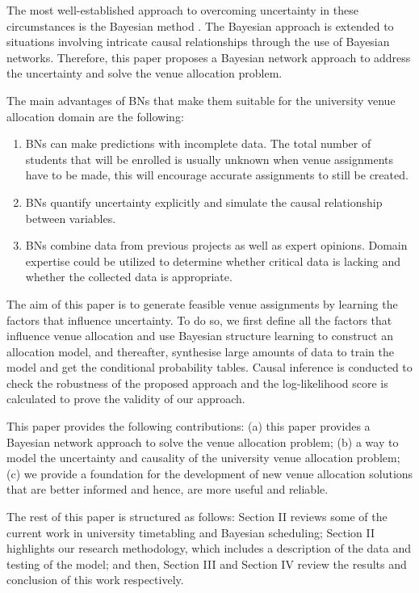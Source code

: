 \documentclass[conference]{IEEEtran}
\begin{document}
The most well-established approach to overcoming uncertainty in these circumstances is the Bayesian method \cite{efron2005bayesians}. The Bayesian approach is extended to situations involving intricate causal relationships through the use of Bayesian networks. Therefore, this paper proposes a Bayesian network approach to address the uncertainty and solve the venue allocation problem.

The main advantages of BNs that make them suitable for the university venue allocation domain are the following:
\begin{enumerate}
    \item BNs can make predictions with incomplete data. The total number of students that will be enrolled is usually unknown when venue assignments have to be made, this will encourage accurate assignments to still be created.
    \item BNs quantify uncertainty explicitly and simulate the causal relationship between variables. 
    \item BNs combine data from previous projects as well as expert opinions. Domain expertise could be utilized to determine whether critical data is lacking and whether the collected data is appropriate.
\end{enumerate}

The aim of this paper is to generate feasible venue assignments by learning the factors that influence uncertainty. To do so, we first define all the factors that influence venue allocation and use Bayesian structure learning to construct an allocation model, and thereafter, synthesise large amounts of data to train the model and get the conditional probability tables. Causal inference is conducted to check the robustness of the proposed approach and the log-likelihood score is calculated to prove the validity of our approach.

This paper provides the following contributions: (a) this paper provides a Bayesian network approach to solve the venue allocation problem; (b) a way to model the uncertainty and causality of the university venue allocation problem; (c) we provide a foundation for the development of new venue allocation solutions that are better informed and hence, are more useful and reliable.  

The rest of this paper is structured as follows: Section II reviews some of the current work in university timetabling and Bayesian scheduling; Section II highlights our research methodology, which includes a description of the data and testing of the model; and then, Section III and Section IV review the results and conclusion of this work respectively.
\end{document}
